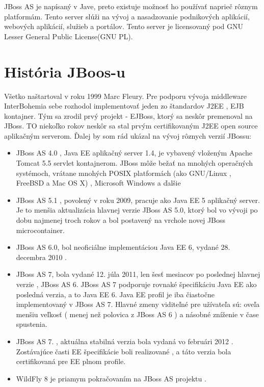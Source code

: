  JBoss AS je napísaný v Jave, preto existuje možnosť  ho používať naprieč rôznym platformám. Tento server slúži na vývoj a nasadzovanie podnikových aplikácií, webových aplikácií, služieb a portálov. Tento server je licensovaný pod GNU Lesser General Public License(GNU PL).

\section{História JBoos-u}
Všetko naštartoval v roku 1999 Marc Fleury. Pre podporu vývoja middleware InterBohemia sebe rozhodol implementovať jeden zo štandardov J2EE , EJB kontajner. Tým sa zrodil prvý projekt - EJBoss, ktorý sa neskôr premenoval na JBoss. TO niekoľko rokov neskôr sa stal prvým certifikovaným  J2EE  open source aplikačným serverom. Ďalej by som rád ukázal na vývoj rôznych verzií JBossu:\cite{jbossWeb}


\begin{itemize}
\item JBoss AS 4.0 , Java EE aplikačný server 1.4, je vybavený vloženým Apache Tomcat 5.5 servlet kontajnerom. JBoss môže bežať na mnohých operačných systémoch, vrátane mnohých POSIX platformách (ako GNU/Linux , FreeBSD a Mac OS X) , Microsoft Windows a ďalšie
\item JBoss AS 5.1 , povolený v roku 2009, pracuje ako Java EE 5 aplikačný server. Je to menšia aktualizácia hlavnej verzie JBoss AS 5.0, ktorý bol vo vývoji po dobu najmenej troch rokov a bol postavený na vrchole novej JBoss microcontainer.

\item JBoss AS 6.0, bol neoficiálne implementáciou Java EE 6, vydané 28. decembra 2010 .

\item JBoss AS 7, bola vydané 12. júla 2011, len šesť mesiacov po poslednej hlavnej verzie , JBoss AS 6. JBoss AS 7 podporuje rovnaké špecifikáciu Java EE ako posledná verzia, a to Java EE 6. Java EE profil je iba čiastočne implementovaný v JBoss AS 7. Hlavné zmeny viditeľné pre užívateľa sú: oveľa menšiu veľkosť ( menej než polovica z JBoss AS 6 ) a násobné zníženie v čase spustenia.

\item JBoss AS 7. , aktuálna stabilná verzia bola vydaná vo februári 2012 . Zostávajúce časti EE špecifikácie boli realizované , a táto verzia bola certifikovaná pre EE plnom profile.

\item WildFly 8 je priamym pokračovaním na JBoss AS projektu .

\end{itemize}

